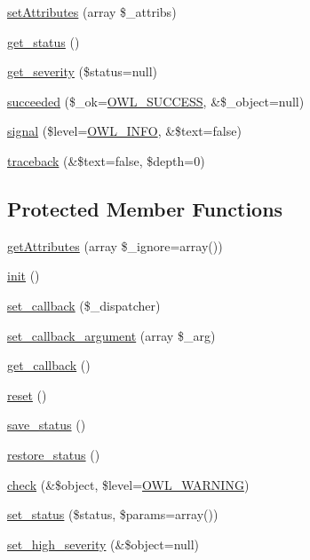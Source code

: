 \begin{DoxyCompactItemize}
\hyperlink{classBaseElement_a7d8ddd64ceb3401a7cb84548656b3709}{setAttributes} (array \$\_\-attribs)
\item 
\hyperlink{class__OWL_a99ec771fa2c5c279f80152cc09e489a8}{get\_\-status} ()
\item 
\hyperlink{class__OWL_adf9509ef96858be7bdd9414c5ef129aa}{get\_\-severity} (\$status=null)
\item 
\hyperlink{class__OWL_a53ab4d3bbb2c6a56966c339ca4b4c805}{succeeded} (\$\_\-ok=\hyperlink{owl_8severitycodes_8php_a96223f06ba27bf5cbefa6e9d702897c2}{OWL\_\-SUCCESS}, \&\$\_\-object=null)
\item 
\hyperlink{class__OWL_a51ba4a16409acf2a2f61f286939091a5}{signal} (\$level=\hyperlink{owl_8severitycodes_8php_a139328861128689f2f4def6a399d9057}{OWL\_\-INFO}, \&\$text=false)
\item 
\hyperlink{class__OWL_aa29547995d6741b7d2b90c1d4ea99a13}{traceback} (\&\$text=false, \$depth=0)
\end{DoxyCompactItemize}
\subsection*{Protected Member Functions}
\begin{DoxyCompactItemize}
\item 
\hyperlink{classBaseElement_a5cb9a5224e12b4d7017531ee5e2c9778}{getAttributes} (array \$\_\-ignore=array())
\item 
\hyperlink{class__OWL_ae0ef3ded56e8a6b34b6461e5a721cd3e}{init} ()
\item 
\hyperlink{class__OWL_a28d9025eaf37b49d63cb334ed28c33f0}{set\_\-callback} (\$\_\-dispatcher)
\item 
\hyperlink{class__OWL_a1e26611ce858b237f5a98a91ea3c3a1b}{set\_\-callback\_\-argument} (array \$\_\-arg)
\item 
\hyperlink{class__OWL_abded13b1c97ea6e0cfe3c68cb6bcf7a5}{get\_\-callback} ()
\item 
\hyperlink{class__OWL_a2f2a042bcf31965194c03033df0edc9b}{reset} ()
\item 
\hyperlink{class__OWL_a9e49b9c76fbc021b244c6915ea536d71}{save\_\-status} ()
\item 
\hyperlink{class__OWL_a465eeaf40edd9f9c848841700c32ce55}{restore\_\-status} ()
\item 
\hyperlink{class__OWL_ae2e3c56e5f3c4ce4156c6b1bb1c50f63}{check} (\&\$object, \$level=\hyperlink{owl_8severitycodes_8php_ace886152e2e86cd2e91cb833fd495adb}{OWL\_\-WARNING})
\item 
\hyperlink{class__OWL_aea912d0ede9b3c2a69b79072d94d4787}{set\_\-status} (\$status, \$params=array())
\item 
\hyperlink{class__OWL_a576829692a3b66e3d518853bf43abae3}{set\_\-high\_\-severity} (\&\$object=null)
\end{DoxyCompactItemize}
